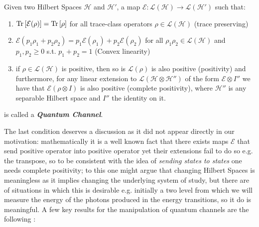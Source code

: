 \begin{definition}
  Given two Hilbert Spaces $\mathcal{H}$ and $\mathcal{H}'$, a map $\mathcal{E}:\mathcal{L}(\mathcal{H})\to\mathcal{L}(\mathcal{H}')$ such that:
  \begin{enumerate}
          \item $\mathrm{Tr}\left[\mathcal{E}(\rho)\right]=\mathrm{Tr}\left[\rho\right]$ for all trace-class operators $\rho \in \mathcal{L}(\mathcal{H})$ (trace preserving)
          \item $\mathcal{E}(p_{1}\rho_{1}+p_{2}\rho_{2}) =p_{1}\mathcal{E}(\rho_{1})+p_{2}\mathcal{E}(\rho_{2}) $ for all $\rho_{1} \rho_{2} \in \mathcal{L}(\mathcal{H})$ and $p_{1}, p_{2} \geq 0$ s.t. $p_{1}+p_{2}=1$ (Convex linearity)
    \item if $\rho \in \mathcal{L}(\mathcal{H})$ is positive, then so is $\mathcal{L}(\rho)$ is also positive (positivity) and furthermore,
          for any linear extension to $\mathcal{L}(\mathcal{H}\otimes \mathcal{H}'')$ of the form $\mathcal{E}\otimes I''$ we have that
          $\mathcal{E}(\rho \otimes I)$ is also positive (complete positivity), where $\mathcal{H}''$ is any separable Hilbert space
          and $I''$ the identity on it.
  \end{enumerate}
  is called a \textbf{\textit{Quantum Channel}}.
\end{definition}
The last condition deserves a discussion as it did not appear directly in our motivation: mathematically it is a well known fact that there
exists maps $\mathcal{E}$ that send positive operator into positive operator yet their extensions fail to do so e.g. the transpose, so
to be consistent with the idea of \textit{sending states to states} one needs complete positivity;
to this one might argue that changing Hilbert Spaces is meaningless as it implies changing the underlying system of study, but there are of situations in which this is desirable e.g. initially a two level from which we will measure the energy of the photons produced in the energy
transitions, so it do is meaningful. A few key results for the manipulation of quantum channels are the following \cite{nielsen_quantum_2010,wiseman_quantum_2010}:

